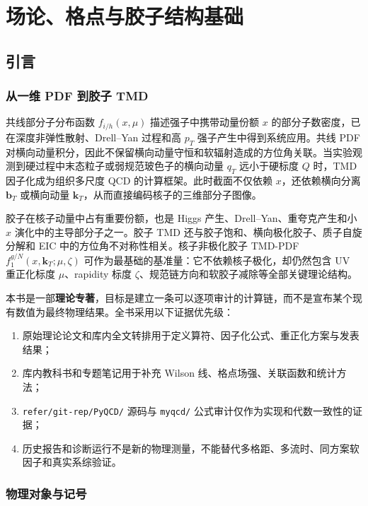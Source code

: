 \documentclass[UTF8,12pt,a4paper,twoside,openany]{ctexbook}
\newcommand{\bT}{\boldsymbol b_T}
\newcommand{\kT}{\boldsymbol k_T}
\newcommand{\fone}{f_{1}^{g/N}}
\begin{document}
\mainmatter
\part{场论、格点与胶子结构基础}
\chapter{引言}

\section{从一维 PDF 到胶子 TMD}

共线部分子分布函数 \(f_{i/h}(x,\mu)\) 描述强子中携带动量份额 \(x\) 的部分子数密度，已在深度非弹性散射、Drell--Yan 过程和高 \(p_T\) 强子产生中得到系统应用。共线 PDF 对横向动量积分，因此不保留横向动量守恒和软辐射造成的方位角关联。当实验观测到硬过程中末态粒子或弱规范玻色子的横向动量 \(q_T\) 远小于硬标度 \(Q\) 时，TMD 因子化成为组织多尺度 QCD 的计算框架\cite{Collins2011}。此时截面不仅依赖 \(x\)，还依赖横向分离 \(\bT\) 或横向动量 \(\kT\)，从而直接编码核子的三维部分子图像。

胶子在核子动量中占有重要份额，也是 Higgs 产生、Drell--Yan、重夸克产生和小 \(x\) 演化中的主导部分子之一。胶子 TMD 还与胶子饱和、横向极化胶子、质子自旋分解和 EIC 中的方位角不对称性相关\cite{JiReview2021,Meissner2007}。核子非极化胶子 TMD-PDF \(\fone(x,\kT;\mu,\zeta)\) 可作为最基础的基准量：它不依赖核子极化，却仍然包含 UV 重正化标度 \(\mu\)、rapidity 标度 \(\zeta\)、规范链方向和软胶子减除等全部关键理论结构。

本书是一部\textbf{理论专著}，目标是建立一条可以逐项审计的计算链，而不是宣布某个现有数值为最终物理结果。全书采用以下证据优先级：
\begin{enumerate}
  \item 原始理论论文和库内全文转排用于定义算符、因子化公式、重正化方案与发表结果；
  \item 库内教科书和专题笔记用于补充 Wilson 线、格点场强、关联函数和统计方法；
  \item \texttt{refer/git-rep/PyQCD/} 源码与 \texttt{myqcd/} 公式审计仅作为实现和代数一致性的证据；
  \item 历史报告和诊断运行不是新的物理测量，不能替代多格距、多流时、同方案软因子和真实系综验证。
\end{enumerate}

\section{物理对象与记号}
\end{document}
